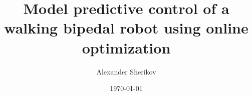 \documentclass[latexfonts,mas]{oru-thesis}
\title{Model predictive control of a walking bipedal robot using online optimization}
\author{Alexander Sherikov}
\date{\today}
\begin{document}
\sloppy

\mainmatter







\appendix


\end{document}
